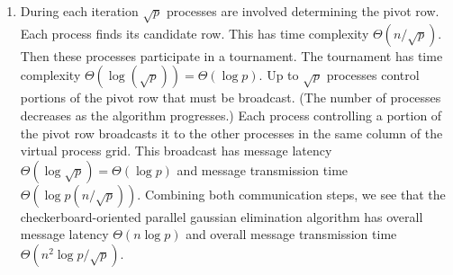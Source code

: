 \begin{enumerate}
\begin{enumerate}
      The overall estimated execution time of the parallel program is
      $$\chi n^3/p + \lceil\log p\rceil(3\lambda + n/(2\beta))$$

\item Assume the execution time of the sequential algorithm is $\chi n^3$.
      With interleaved columns, the work is divided more or less evenly among
      the processors, so we can assume the parallel program requires time
      $\chi n^3/p$ to perform these computations.

      Also, a single process is responsible for determining the pivot
      element each iteration. Assuming it takes $\chi$ time units to check
      each pivot row, and given an average of $n/2$ rows to check per iteration,
      the time needed to determine the pivot row is $\chi n^2/2$.

      After the tournament one process broadcasts column $i$ to the other
      processes. This column does not shrink as the algorithm progresses,
      because the unmarked rows are scattered throughout the matrix.
      If $\beta$ measures bandwidth in terms of elements per second, then
      the total communication time for the column broadcasts is
      $n\lceil\log p\rceil(\lambda + n/beta)$.

      The overall estimated execution time of the parallel program is
      $$\chi (n^3/p + n^2/2) + \lceil\log p\rceil(\lambda + n/\beta)$$
\end{enumerate}

\addtocounter{enumi}{1}
\addtocounter{enumi}{1}

\item
During each iteration $\sqrt{p}$ processes are involved determining
the pivot row. Each process finds its candidate row. This has time
complexity $\Theta(n/\sqrt{p})$.
Then these processes participate in a tournament.
The tournament has time complexity $\Theta(\log(\sqrt{p})) =
\Theta(\log p)$.
Up to $\sqrt{p}$ processes control portions of the pivot row that
must be broadcast. (The number of processes decreases as the algorithm
progresses.)
Each process controlling a portion of the pivot row broadcasts it to the
other processes in the same column of the virtual process grid.
This broadcast has message latency $\Theta(\log\sqrt{p}) = \Theta(\log p)$
and message transmission time $\Theta(\log{p}(n/\sqrt{p}))$.
Combining both communication steps, we see that the checkerboard-oriented
parallel gaussian elimination algorithm has overall message latency
$\Theta(n\log p)$ and overall message transmission time
$\Theta(n^2\log {p}/\sqrt{p})$.


\end{enumerate}
